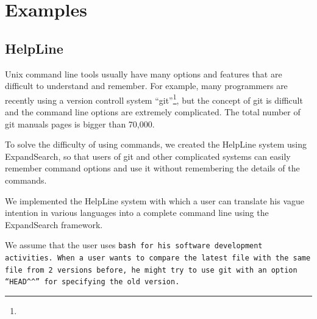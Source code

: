 \documentclass[manuscript,anonymous,review]{acmart}
\def\HL{\textsf{HelpLine}}
\def\GIT{\texttt{git}}
\def\ES{\textsf{ExpandSearch}}
\begin{document}
\section{Examples}

% 

\subsection{HelpLine}

Unix command line tools usually have many options and features that are difficult to
understand and remember.
For example, many programmers are recently using a version controll system
``git''\footnote{
},
but the concept of git is difficult and the command line options are extremely complicated.
The total number of git manuals pages is bigger than 70,000.

To solve the difficulty of using commands,
we created the {\HL} system using {\ES}, so that users of git and other complicated systems can
easily remember command options and use it without remembering the details of the commands.

We implemented the {\HL} system
with which a user can translate his vague intention in various languages
into a complete command line using the {\ES} framework.


We assume that the user uses \tt{bash} for his software development activities.
% 
When a user wants to compare the latest  file
with the same file from 2 versions before,
he might try to use {\GIT} with an option
``{\smallfont\verb|HEAD^^|}''
for specifying the old version.
\end{document}
